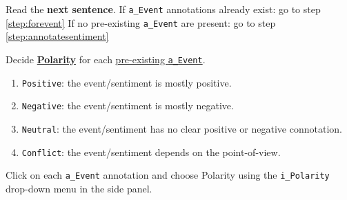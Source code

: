 \begin{steps}[leftmargin=*]
    
    \item \label{step:start} Read the \textbf{next sentence}.
    If \eventcolor \texttt{a\_Event} annotations already exist: go to step \ref{step:forevent}
    If no pre-existing \texttt{a\_Event} are present: go to step \ref{step:annotatesentiment}
    
    \item \label{step:forevent} Decide \hyperlink{sec:polaritydefinition}{\textbf{Polarity}} for each \hyperlink{sec:eventdefinition}{pre-existing \texttt{a\_Event}}.
    \begin{enumerate}[label=\alph*), leftmargin=*] \label{step:polarity}
        \item \texttt{Positive}: the event/sentiment is mostly positive.
        \item \texttt{Negative}: the event/sentiment is mostly negative.
        \item \texttt{Neutral}: the event/sentiment has no clear positive or negative connotation.
        \item \texttt{Conflict}: the event/sentiment depends on the point-of-view.
    \end{enumerate}
    \textcolor{OliveGreen}{Click on each \eventcolor \texttt{a\_Event} annotation and choose Polarity using the \texttt{i\_Polarity} drop-down menu in the side panel.}
    

\end{steps}
